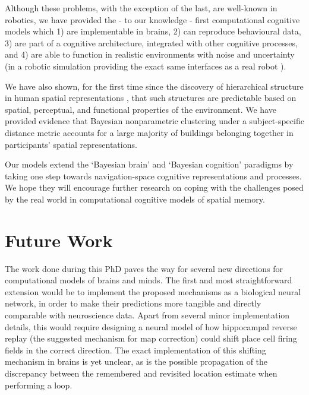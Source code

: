 Although these problems, with the exception of the last, are well-known in robotics, we have provided the - to our knowledge - first computational cognitive models which 1) are implementable in brains, 2) can reproduce behavioural data, 3) are part of a cognitive architecture, integrated with other cognitive processes, and 4) are able to function in realistic environments with noise and uncertainty (in a robotic simulation providing the exact same interfaces as a real robot \citep{rusu2007extending}). 

We have also shown, for the first time since the discovery of hierarchical structure in human spatial representations \citep{hirtle1985evidence}, that such structures are predictable based on spatial, perceptual, and functional properties of the environment. We have provided evidence that Bayesian nonparametric clustering under a subject-specific distance metric accounts for a large majority of buildings belonging together in participants' spatial representations.

Our models extend the `Bayesian brain' \citep{knill2004bayesian} and `Bayesian cognition' \citep{chater2010bayesian} paradigms by taking one step towards navigation-space cognitive representations and processes. We hope they will encourage further research on coping with the challenges posed by the real world in computational cognitive models of spatial memory.

\section{Future Work}

The work done during this PhD paves the way for several new directions for computational models of brains and minds. The first and most straightforward extension would be to implement the proposed mechanisms as a biological neural network, in order to make their predictions more tangible and directly comparable with neuroscience data. Apart from several minor implementation details, this would require designing a neural model of how hippocampal reverse replay (the suggested mechanism for map correction) could shift place cell firing fields in the correct direction. The exact implementation of this shifting mechanism in brains is yet unclear, as is the possible propagation of the discrepancy between the remembered and revisited location estimate when performing a loop. 

